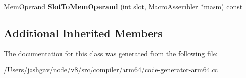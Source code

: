 \begin{DoxyCompactItemize}
\item 
\hyperlink{classv8_1_1internal_1_1_mem_operand}{Mem\+Operand} {\bfseries Slot\+To\+Mem\+Operand} (int slot, \hyperlink{classv8_1_1internal_1_1_macro_assembler}{Macro\+Assembler} $\ast$masm) const \hypertarget{classv8_1_1internal_1_1compiler_1_1_arm64_operand_converter_a7fed632b9f7de6a381f17f00af907027}{}\label{classv8_1_1internal_1_1compiler_1_1_arm64_operand_converter_a7fed632b9f7de6a381f17f00af907027}

\end{DoxyCompactItemize}
\subsection*{Additional Inherited Members}


The documentation for this class was generated from the following file\+:\begin{DoxyCompactItemize}
\item 
/\+Users/joshgav/node/v8/src/compiler/arm64/code-\/generator-\/arm64.\+cc\end{DoxyCompactItemize}
